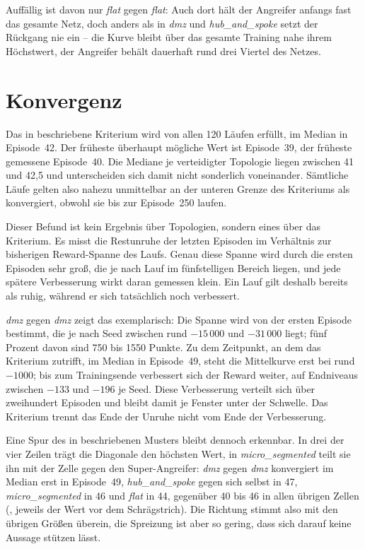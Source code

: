 Auffällig ist davon nur \emph{flat} gegen \emph{flat}: Auch dort hält der
Angreifer anfangs fast das gesamte Netz, doch anders als in \emph{dmz} und
\emph{hub\_and\_spoke} setzt der Rückgang nie ein -- die Kurve bleibt über
das gesamte Training nahe ihrem Höchstwert, der Angreifer behält dauerhaft
rund drei Viertel des Netzes.

\section{Konvergenz}
\label{sec:konvergenzergebnis}

Das in  beschriebene Kriterium wird von allen 120 Läufen
erfüllt, im Median in Episode~42. Der früheste überhaupt mögliche Wert ist
Episode~39, der früheste gemessene Episode~40. Die Mediane je verteidigter Topologie
liegen zwischen 41 und 42,5 und unterscheiden sich damit nicht sonderlich
voneinander.
Sämtliche Läufe gelten also nahezu unmittelbar an der unteren Grenze des
Kriteriums als konvergiert, obwohl sie bis zur Episode~250 laufen.

Dieser Befund ist kein Ergebnis über Topologien, sondern eines über das
Kriterium. Es misst die Restunruhe der letzten Episoden im Verhältnis zur
bisherigen Reward-Spanne des Laufs. Genau diese Spanne wird durch die ersten Episoden sehr groß, die je nach
Lauf im fünfstelligen Bereich liegen, und jede spätere
Verbesserung wirkt daran gemessen klein. Ein Lauf gilt deshalb bereits als
ruhig, während er sich tatsächlich noch verbessert.

\emph{dmz} gegen \emph{dmz} zeigt das exemplarisch: Die Spanne wird von der ersten
Episode bestimmt, die je nach Seed zwischen rund $-15\,000$ und
$-31\,000$ liegt; fünf Prozent davon sind 750 bis 1550 Punkte. Zu dem Zeitpunkt, an dem das Kriterium zutrifft, im Median in
Episode~49, steht die Mittelkurve erst
bei rund $-1000$; bis zum Trainingsende verbessert sich der Reward weiter,
auf Endniveaus zwischen $-133$ und $-196$ je Seed. Diese Verbesserung
verteilt sich über zweihundert Episoden und bleibt damit je
Fenster unter der Schwelle. Das Kriterium trennt das Ende der Unruhe nicht vom Ende
der Verbesserung.

Eine Spur des in  beschriebenen Musters bleibt dennoch
erkennbar. In drei der vier Zeilen trägt die Diagonale den höchsten Wert, in
\emph{micro\_segmented} teilt sie ihn mit der Zelle gegen den
Super-Angreifer: \emph{dmz} gegen \emph{dmz} konvergiert im Median erst in
Episode~49, \emph{hub\_and\_spoke} gegen sich selbst in 47, \emph{micro\_segmented} in 46 und
\emph{flat} in 44, gegenüber 40
bis 46 in allen übrigen Zellen (, jeweils
der Wert vor dem Schrägstrich). Die Richtung stimmt
also mit den übrigen Größen überein, die Spreizung ist aber so gering, dass
sich darauf keine Aussage stützen lässt.

